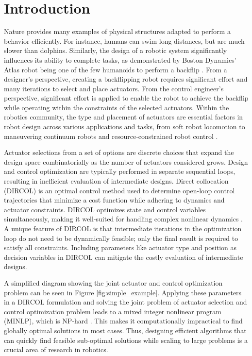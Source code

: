 %
%
%
\section{Introduction}

Nature provides many examples of physical structures adapted to perform a behavior efficiently. For instance, humans can swim long distances, but are much slower than dolphins. Similarly, the design of a robotic system significantly influences its ability to complete tasks, as demonstrated by Boston Dynamics’ Atlas robot being one of the few humanoids to perform a backflip \cite{noauthor_leaps_nodate}. From a designer’s perspective, creating a backflipping robot requires significant effort and many iterations to select and place actuators. From the control engineer’s perspective, significant effort is applied to enable the robot to achieve the backflip while operating within the constraints of the selected actuators. Within the robotics community, the type and placement of actuators are essential factors in robot design across various applications and tasks, from soft robot locomotion \cite{Bhatia2021} to maneuvering continuum robots \cite{baykal_asymptotically_2019, a_kuntz_kinematic_2018, c_bergeles_concentric_2015, t_anor_algorithms_2011, j_-t_lin_generalized_2022, morimoto_toward_2018, s_niyaz_optimizing_2019} and resource-constrained robot control \cite{Seifried2012}. 

Actuator selections from a set of options are discrete choices that expand the design space combinatorially as the number of actuators considered grows. Design and control optimization are typically performed in separate sequential loops, resulting in inefficient evaluation of intermediate designs. Direct collocation (DIRCOL) is an optimal control method used to determine open-loop control trajectories that minimize a cost function while adhering to dynamics and actuator constraints. DIRCOL optimizes state and control variables simultaneously, making it well-suited for handling complex nonlinear dynamics \cite{hargraves1987}. A unique feature of DIRCOL is that intermediate iterations in the optimization loop do not need to be dynamically feasible; only the final result is required to satisfy all constraints. Including parameters like actuator type and position as decision variables in DIRCOL can mitigate the costly evaluation of intermediate designs.

A simplified diagram showing the joint actuator and control optimization problem can be seen in Figure \ref{fig:simple_example}. Applying these parameters in a DIRCOL formulation and solving the joint problem of actuator selection and control optimization problem leads to a mixed integer nonlinear program (MINLP), which is NP-hard \cite{olshevsky2014minimal}. This makes it computationally impractical to find globally optimal solutions in most cases. Thus, designing efficient algorithms that can quickly find feasible sub-optimal solutions while scaling to large problems is a crucial area of research in robotics. 

